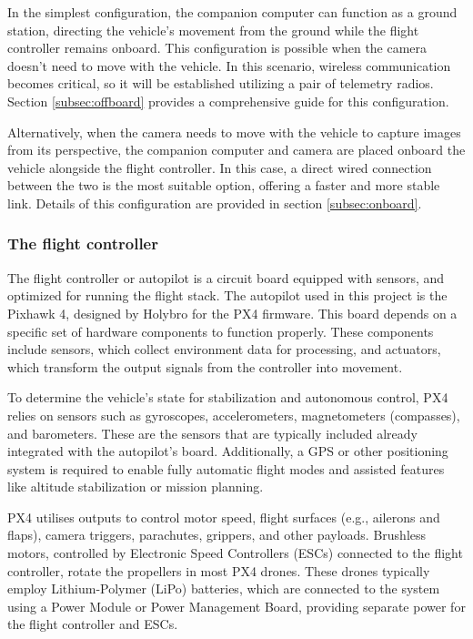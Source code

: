 In the simplest configuration, the companion computer can function as a ground station, directing the vehicle's movement from the ground while the flight controller remains onboard. This configuration is possible when the camera doesn't need to move with the vehicle. In this scenario, wireless communication becomes critical, so it will be established utilizing a pair of telemetry radios. Section \ref{subsec:offboard} provides a comprehensive guide for this configuration.

Alternatively, when the camera needs to move with the vehicle to capture images from its perspective, the companion computer and camera are placed onboard the vehicle alongside the flight controller. In this case, a direct wired connection between the two is the most suitable option, offering a faster and more stable link. Details of this configuration are provided in section \ref{subsec:onboard}.

\subsubsection{The flight controller}

The flight controller or autopilot is a circuit board equipped with sensors, and optimized for running the flight stack.
The autopilot used in this project is the Pixhawk 4, designed by Holybro for the PX4 firmware.
This board depends on a specific set of hardware components to function properly.
These components include sensors, which collect environment data for processing, and actuators, which transform the output signals from the controller into movement.

To determine the vehicle's state for stabilization and autonomous control, PX4 relies on sensors such as gyroscopes, accelerometers, magnetometers (compasses), and barometers.
These are the sensors that are typically included already integrated with the autopilot's board.
Additionally, a GPS or other positioning system is required to enable fully automatic flight modes and assisted features like altitude stabilization or mission planning.

PX4 utilises outputs to control motor speed, flight surfaces (e.g., ailerons and flaps), camera triggers, parachutes, grippers, and other payloads. Brushless motors, controlled by Electronic Speed Controllers (ESCs) connected to the flight controller, rotate the propellers in most PX4 drones. These drones typically employ Lithium-Polymer (LiPo) batteries, which are connected to the system using a Power Module or Power Management Board, providing separate power for the flight controller and ESCs. 

